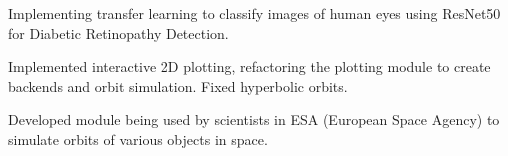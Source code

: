 \documentclass[a4paper]{deedy-resume-openfont}
\begin{document}
\begin{minipage}[t]{0.66\textwidth}
\begin{tightemize}
\item Implementing transfer learning to classify images of human eyes using ResNet50 for Diabetic Retinopathy Detection.
\end{tightemize}


\begin{tightemize}
\item Implemented interactive 2D plotting, refactoring the plotting module to create backends and orbit simulation. Fixed hyperbolic orbits.
\item Developed module being used by scientists in ESA (European Space Agency) to simulate orbits of various objects in space.

\end{tightemize}




\end{minipage}
\end{document}
